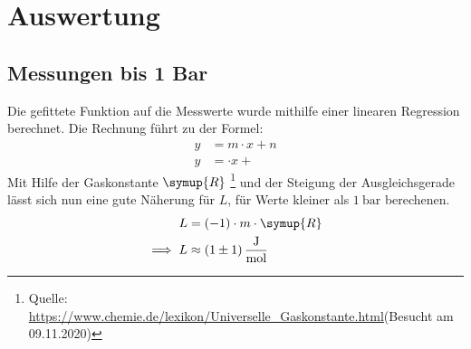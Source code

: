 \section{Auswertung}

\subsection{Messungen bis 1 Bar}



Die gefittete Funktion auf die Messwerte wurde mithilfe einer linearen Regression berechnet.
Die Rechnung führt zu der Formel:
\begin{align}
    y&=m\cdot x+n\\
    y&= \cdot x+
\end{align}
Mit Hilfe der Gaskonstante $\symup{R}$   \footnote{Quelle: \url{https://www.chemie.de/lexikon/Universelle_Gaskonstante.html}(Besucht am 09.11.2020)}
und der Steigung der Ausgleichsgerade lässt sich nun eine gute Näherung für $L$, für Werte kleiner als $\SI{1}{\bar}$ berechenen.
\begin{align}
    L&=(-1) \cdot m \cdot \symup{R}\\
    \implies L&\approx\SI{1(1)}{\joule\per\mol}
\end{align}
 












